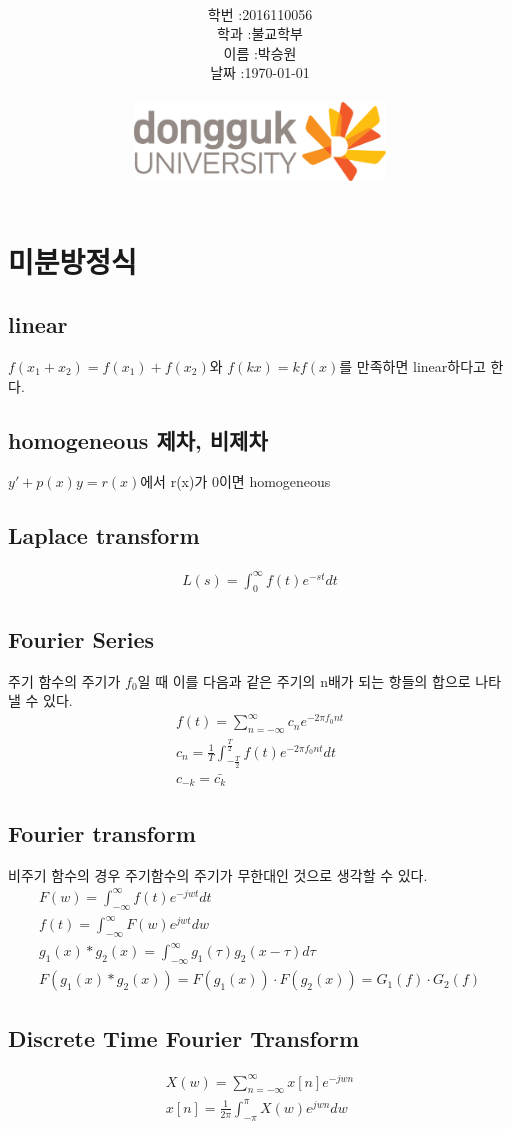 \documentclass[12pt,a4paper]{article}
\title{
	\centering
	\pgfornament[width=12cm,color=teal]{84}\\
	\vspace{1cm}
	\fontsize{50}{50} \selectfont {정보통신 수학 및 실습\\Summary}\\
		\pgfornament[width=12cm,color=teal]{88}\\
	\vfill}
\author{
	\LARGE
	\begin{tabular}{rl}
		\hline
		학번 : & 2016110056\\ 
		학과 : & 불교학부 \\
		이름 : & 박승원\\
		날짜 : & \today\\
		\hline
	\end{tabular}\vspace{2cm}
	\\
\includegraphics[width=0.5\textwidth]{logo.jpg}
	}
\date{}
\begin{document}
\maketitle
{}
\noindent
\lstset{language=matlab, columns=flexible, tabsize=4, frame=shadowbox, showstringspaces=false, breaklines=true, upquote=true, basicstyle=\normalsize}

\renewcommand{\thesubsubsection}{\alph{subsubsection})}
\renewcommand{\thesubsection}{\arabic{subsection}.}
\newpage

\section{미분방정식}
\subsection{linear}
$f(x_1+x_2)=f(x_1)+f(x_2)$와 $
f(kx)=kf(x)$를 만족하면 linear하다고 한다.
\subsection{homogeneous 제차, 비제차}
$y'+p(x)y=r(x)$에서 r(x)가 0이면 homogeneous

\subsection{Laplace transform}
\begin{gather*}
L(s)=\int_0^\infty f(t)e^{-st}dt
\end{gather*} 
\subsection{Fourier Series}
주기 함수의 주기가 $f_0$일 때 이를 다음과 같은 주기의 n배가 되는 항들의 합으로 나타낼 수 있다.
\begin{gather*}
f(t)=\sum_{n=-\infty}^{\infty} c_n e^{-2\pi f_0 nt}\\
c_n = \frac{1}{T}\int_{-\frac{T}{2}}^{\frac{T}{2}}f(t)e^{-2\pi f_0 nt}dt\\
c_{-k} = \bar{c_k}
\end{gather*} 
\subsection{Fourier transform}
비주기 함수의 경우 주기함수의 주기가 무한대인 것으로 생각할 수 있다.
\begin{gather*}
F(w) = \int_{-\infty}^{\infty}f(t)e^{-jwt}dt\\
f(t) = \int_{-\infty}^{\infty}F(w)e^{jwt}dw\\
g_1(x)*g_2(x) = \int_{-\infty}^{\infty}g_1(\tau)g_2(x-\tau)d\tau\\
F(g_1(x)*g_2(x)) = F(g_1(x))\cdot F(g_2(x)) = G_1(f)\cdot G_2(f)
\end{gather*}
\subsection{Discrete Time Fourier Transform}
\begin{gather*}
X(w) = \sum_{n=-\infty}^{\infty}x[n]e^{-jwn}\\
x[n] = \frac{1}{2\pi}\int_{-\pi}^{\pi}X(w)e^{jwn}dw
\end{gather*}
\end{document}
